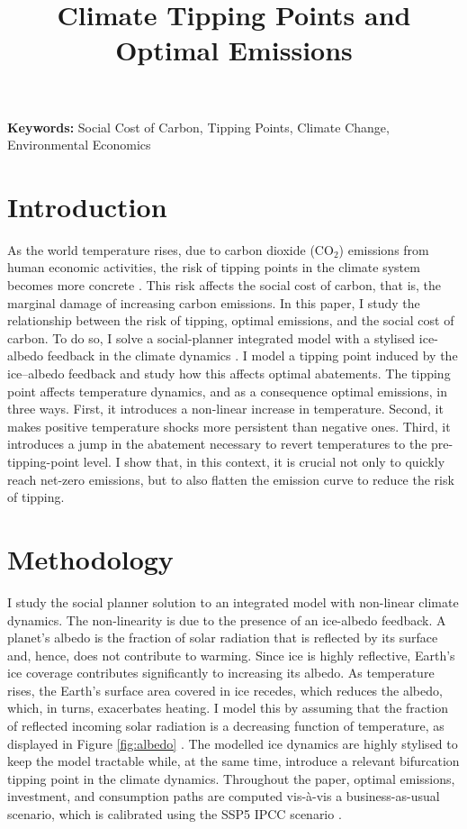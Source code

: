 \documentclass[12pt]{article}
\title{Climate Tipping Points and Optimal Emissions}
\author{} %
\date{} %
\begin{document}
\maketitle

\textbf{Keywords:} Social Cost of Carbon, Tipping Points, Climate Change, Environmental Economics

\section{Introduction}

As the world temperature rises, due to carbon dioxide (CO$_2$) emissions from human economic activities, the risk of tipping points in the climate system becomes more concrete \citep{ashwin_extreme_2020,sledd_cloudier_2021}. This risk affects the social cost of carbon, that is, the marginal damage of increasing carbon emissions. In this paper, I study the relationship between the risk of tipping, optimal emissions, and the social cost of carbon. To do so, I solve a social-planner integrated model with a stylised ice-albedo feedback in the climate dynamics \citep{hogg_glacial_2008,ashwin_tipping_2012}. I model a tipping point induced by the ice–albedo feedback and study how this affects optimal abatements. The tipping point affects temperature dynamics, and as a consequence optimal emissions, in three ways. First, it introduces a non-linear increase in temperature. Second, it makes positive temperature shocks more persistent than negative ones. Third, it introduces a jump in the abatement necessary to revert temperatures to the pre-tipping-point level. I show that, in this context, it is crucial not only to quickly reach net-zero emissions, but to also flatten the emission curve to reduce the risk of tipping.

\section{Methodology}

I study the social planner solution to an integrated model with non-linear climate dynamics. The non-linearity is due to the presence of an ice-albedo feedback. A planet's albedo is the fraction of solar radiation that is reflected by its surface and, hence, does not contribute to warming. Since ice is highly reflective, Earth's ice coverage contributes significantly to increasing its albedo. As temperature rises, the Earth's surface area covered in ice recedes, which reduces the albedo, which, in turns, exacerbates heating. I model this by assuming that the fraction of reflected incoming solar radiation is a decreasing function of temperature, as displayed in Figure \ref{fig:albedo} \citep{oerlemans_ice_1984, mendez_investigating_2021}. The modelled ice dynamics are highly stylised to keep the model tractable while, at the same time, introduce a relevant bifurcation tipping point in the climate dynamics. Throughout the paper, optimal emissions, investment, and consumption paths are computed vis-à-vis a business-as-usual scenario, which is calibrated using the SSP5 IPCC scenario \citep{kriegler_fossil-fueled_2017}.
\end{document}
